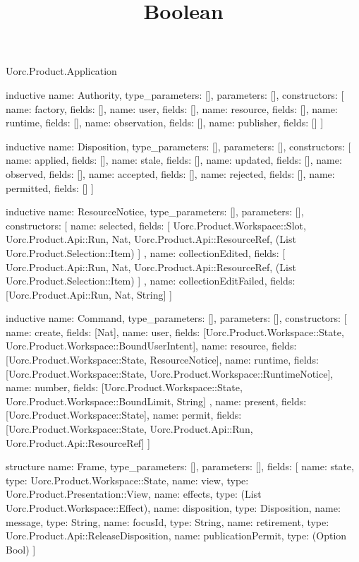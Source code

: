 \begin{lexlean}{Uorc.Product.Application}
\title{Boolean}
\begin{semanticmodule}
inductive{
  name: Authority,
  type_parameters: [],
  parameters: [],
  constructors: [
    {name: factory, fields: []},
    {name: user, fields: []},
    {name: resource, fields: []},
    {name: runtime, fields: []},
    {name: observation, fields: []},
    {name: publisher, fields: []}
  ]
}

inductive{
  name: Disposition,
  type_parameters: [],
  parameters: [],
  constructors: [
    {name: applied, fields: []},
    {name: stale, fields: []},
    {name: updated, fields: []},
    {name: observed, fields: []},
    {name: accepted, fields: []},
    {name: rejected, fields: []},
    {name: permitted, fields: []}
  ]
}

inductive{
  name: ResourceNotice,
  type_parameters: [],
  parameters: [],
  constructors: [
    {
      name: selected,
      fields: [
        Uorc.Product.Workspace::Slot,
        Uorc.Product.Api::Run,
        Nat,
        Uorc.Product.Api::ResourceRef,
        (List Uorc.Product.Selection::Item)
      ]
    },
    {
      name: collectionEdited,
      fields: [
        Uorc.Product.Api::Run,
        Nat,
        Uorc.Product.Api::ResourceRef,
        (List Uorc.Product.Selection::Item)
      ]
    },
    {name: collectionEditFailed, fields: [Uorc.Product.Api::Run, Nat, String]}
  ]
}

inductive{
  name: Command,
  type_parameters: [],
  parameters: [],
  constructors: [
    {name: create, fields: [Nat]},
    {name: user, fields: [Uorc.Product.Workspace::State, Uorc.Product.Workspace::BoundUserIntent]},
    {name: resource, fields: [Uorc.Product.Workspace::State, ResourceNotice]},
    {name: runtime, fields: [Uorc.Product.Workspace::State, Uorc.Product.Workspace::RuntimeNotice]},
    {
      name: number,
      fields: [Uorc.Product.Workspace::State, Uorc.Product.Workspace::BoundLimit, String]
    },
    {name: present, fields: [Uorc.Product.Workspace::State]},
    {
      name: permit,
      fields: [Uorc.Product.Workspace::State, Uorc.Product.Api::Run, Uorc.Product.Api::ResourceRef]
    }
  ]
}

structure{
  name: Frame,
  type_parameters: [],
  parameters: [],
  fields: [
    {name: state, type: Uorc.Product.Workspace::State},
    {name: view, type: Uorc.Product.Presentation::View},
    {name: effects, type: (List Uorc.Product.Workspace::Effect)},
    {name: disposition, type: Disposition},
    {name: message, type: String},
    {name: focusId, type: String},
    {name: retirement, type: Uorc.Product.Api::ReleaseDisposition},
    {name: publicationPermit, type: (Option Bool)}
  ]
}


\end{semanticmodule}
\end{lexlean}
